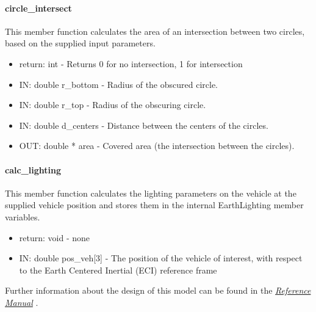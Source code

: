 \paragraph{circle\_intersect}

This member function calculates the area of an intersection between
two circles, based on the supplied input parameters.
\begin{itemize}
\item{return:} int - Returns 0 for no intersection, 1 for intersection
\item{IN:} double r\_bottom - Radius of the obscured circle.
\item{IN:} double r\_top - Radius of the obscuring circle.
\item{IN:} double d\_centers - Distance between the centers of the circles.
\item{OUT:} double * area - Covered area (the intersection between
the circles).
\end{itemize}

\paragraph{calc\_lighting}

This member function calculates the lighting parameters on the vehicle
at the supplied vehicle position and stores them in the internal
EarthLighting member variables.
\begin{itemize}
\item{return:} void - none
\item{IN:} double pos\_veh[3] - The position of the vehicle of interest,
with respect to the Earth Centered Inertial (ECI) reference frame
\end{itemize}

Further information about the design of this model can be found
in the  \href{file:refman.pdf} {\em Reference Manual}
\cite{earthlightingbib:ReferenceManual}.

